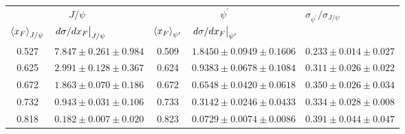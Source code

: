 \begin{tabular}{cc|cc|c}
\hline
\multicolumn{2}{c|}{$J/\psi$} &
  \multicolumn{2}{c|}{$\psi^{\prime}$} &
  \multicolumn{1}{l}{\multirow{2}{*}{$\sigma_{\psi^\prime}/\sigma_{J/\psi}$}} \\ \cline{1-4}
\multicolumn{1}{l}{$\expval{x_F}_{J/\psi}$} &
  \multicolumn{1}{l|}{$\eval{d\sigma/dx_F}_{J/\psi}$} &
  \multicolumn{1}{l}{$\expval{x_F}_{\psi^\prime}$} &
  \multicolumn{1}{l|}{$\eval{d\sigma/dx_F}_{\psi^\prime}$} &
  \multicolumn{1}{l}{} \\ \hline
\multicolumn{1}{c|}{0.527} &
  $7.847\pm0.261\pm0.984$ &
  \multicolumn{1}{c|}{0.509} &
  $1.8450\pm0.0949\pm0.1606$ &
  $0.233\pm0.014\pm0.027$ \\
\multicolumn{1}{c|}{0.625} &
  $2.991\pm0.128\pm0.367$ &
  \multicolumn{1}{c|}{0.624} &
  $0.9383\pm0.0678\pm0.1084$ &
  $0.311\pm0.026\pm0.022$ \\
\multicolumn{1}{c|}{0.672} &
  $1.863\pm0.070\pm0.186$ &
  \multicolumn{1}{c|}{0.672} &
  $0.6548\pm0.0420\pm0.0618$ &
  $0.350\pm0.026\pm0.034$ \\
\multicolumn{1}{c|}{0.732} &
  $0.943\pm0.031\pm0.106$ &
  \multicolumn{1}{c|}{0.733} &
  $0.3142\pm0.0246\pm0.0433$ &
  $0.334\pm0.028\pm0.008$ \\
\multicolumn{1}{c|}{0.818} &
  $0.182\pm0.007\pm0.020$ &
  \multicolumn{1}{c|}{0.823} &
  $0.0729\pm0.0074\pm0.0086$ &
  $0.391\pm0.044\pm0.047$ \\ \hline
\end{tabular}
